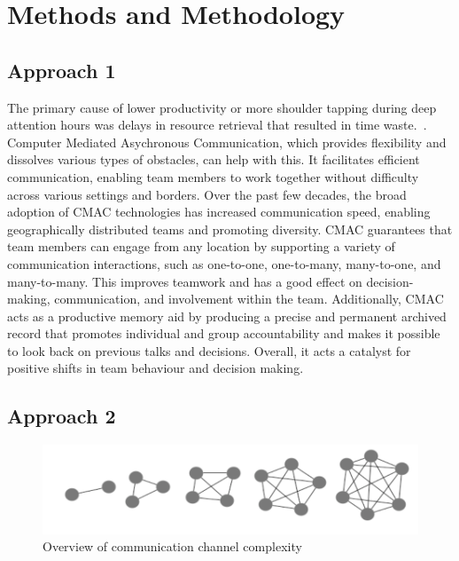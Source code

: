 \documentclass[runningheads]{llncs}
\begin{document}
\section{Methods and Methodology}
\subsection{Approach 1}
The primary cause of lower productivity or more shoulder tapping during deep attention hours was delays in resource retrieval that resulted in time waste.~\cite{refbook1}. Computer Mediated Asychronous Communication, which provides flexibility and dissolves various types of obstacles, can help with this. It facilitates efficient communication, enabling team members to work together without difficulty across various settings and borders. Over the past few decades, the broad adoption of CMAC technologies has increased communication speed, enabling geographically distributed teams and promoting diversity. CMAC guarantees that team members can engage from any location by supporting a variety of communication interactions, such as one-to-one, one-to-many, many-to-one, and many-to-many. This improves teamwork and has a good effect on decision-making, communication, and involvement within the team. Additionally, CMAC acts as a productive memory aid by producing a precise and permanent archived record that promotes individual and group accountability and makes it possible to look back on previous talks and decisions. Overall, it acts a catalyst for positive shifts in team behaviour and decision making.~\cite{refpaper5}

\subsection{Approach 2}

\begin{figure}
    \centering
    \includegraphics[width=0.9\linewidth]{CommunicationComplexity.png}
    \caption{Overview of communication channel complexity}
    \label{fig:communication-complexity}
\end{figure}
\end{document}
